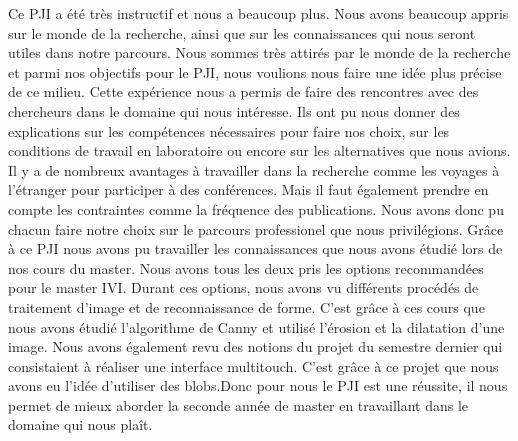 Ce PJI a été très instructif et nous a beaucoup plus. Nous avons beaucoup appris sur le monde 
de la recherche, ainsi que sur les connaissances qui nous seront utiles dans notre parcours.
Nous sommes très attirés par le monde de la recherche et parmi nos objectifs pour le PJI, nous voulions 
nous faire une idée plus précise de ce milieu. Cette expérience nous a permis de faire des rencontres
avec des chercheurs dans le domaine qui nous intéresse. Ils ont pu nous donner des explications
sur les compétences nécessaires pour faire nos choix, sur les conditions de travail en laboratoire 
ou encore sur les alternatives que nous avions. Il y a de nombreux avantages à travailler dans la recherche
comme les voyages à l'étranger pour participer à des conférences. Mais il faut également prendre en compte les contraintes
comme la fréquence des publications. Nous avons donc pu chacun faire notre choix sur le parcours professionel
que nous privilégions.
Grâce à ce PJI nous avons pu travailler les connaissances que nous avons étudié lors de nos cours du master.
Nous avons tous les deux pris les options recommandées pour le master IVI. Durant ces options, nous avons 
vu différents procédés de traitement d'image et de reconnaissance de forme. C'est grâce à ces cours que nous
avons étudié l'algorithme de Canny et utilisé l'érosion et la dilatation d'une image. Nous avons également
revu des notions du projet du semestre dernier qui consistaient à réaliser une interface multitouch. C'est grâce
à ce projet que nous avons eu l'idée d'utiliser des blobs.Donc pour nous le PJI est une réussite, il nous permet de 
mieux aborder la seconde année de master en travaillant dans le domaine qui nous plaît.
\newpage